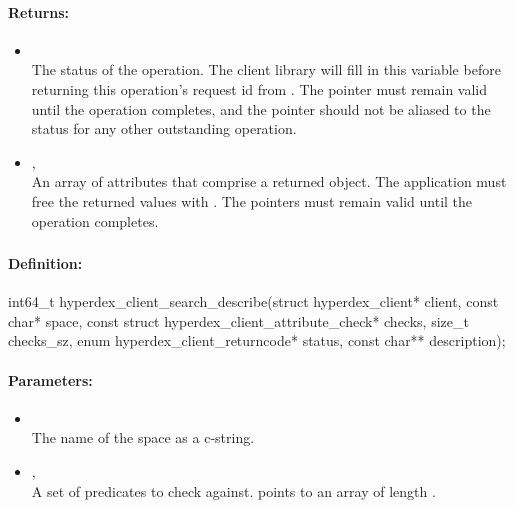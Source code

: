 \paragraph{Returns:}
\begin{itemize}[noitemsep]
\item {}\\
The status of the operation.  The client library will fill in this variable before returning this operation's request id from .  The pointer must remain valid until the operation completes, and the pointer should not be aliased to the status for any other outstanding operation.
\item {}, \\
An array of attributes that comprise a returned object.  The application must free the returned values with .  The pointers must remain valid until the operation completes.
\end{itemize}

\pagebreak
\subsubsection{}
\label{api:c:search_describe}


\paragraph{Definition:}
\begin{ccode}
int64_t hyperdex_client_search_describe(struct hyperdex_client* client,
        const char* space,
        const struct hyperdex_client_attribute_check* checks, size_t checks_sz,
        enum hyperdex_client_returncode* status,
        const char** description);
\end{ccode}

\paragraph{Parameters:}
\begin{itemize}[noitemsep]
\item {}\\
The name of the space as a c-string.
\item {}, \\
A set of predicates to check against.   points to an array of length .
\end{itemize}

